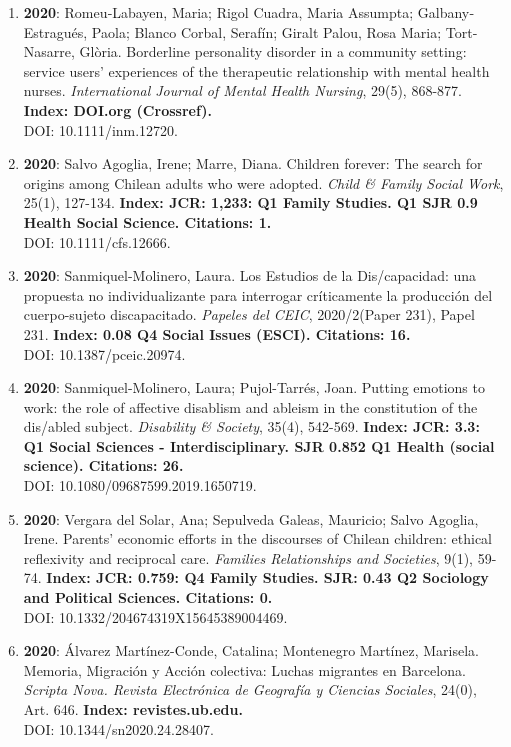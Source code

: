 \begin{enumerate}
\item {\bf 2020}: Romeu‐Labayen, Maria; Rigol Cuadra, Maria Assumpta; Galbany‐Estragués, Paola; Blanco Corbal, Serafín; Giralt Palou, Rosa Maria; Tort‐Nasarre, Glòria.  Borderline personality disorder in a community setting: service users' experiences of the therapeutic relationship with mental health nurses. {\it International Journal of Mental Health Nursing}, 29(5), 868-877. {\bf Index: DOI.org (Crossref). } \\ DOI: 10.1111/inm.12720. \filbreak
\item {\bf 2020}: Salvo Agoglia, Irene; Marre, Diana.  Children forever: The search for origins among Chilean adults who were adopted. {\it Child \& Family Social Work}, 25(1), 127-134. {\bf Index: JCR: 1,233: Q1 Family Studies.  Q1 SJR 0.9 Health Social Science. Citations: 1. } \\ DOI: 10.1111/cfs.12666. \filbreak
\item {\bf 2020}: Sanmiquel-Molinero, Laura.  Los Estudios de la Dis/capacidad: una propuesta no individualizante para interrogar críticamente la producción del cuerpo-sujeto discapacitado. {\it Papeles del CEIC}, 2020/2(Paper 231), Papel 231. {\bf Index: 0.08 Q4 Social Issues (ESCI). Citations: 16. } \\ DOI: 10.1387/pceic.20974. \filbreak
\item {\bf 2020}: Sanmiquel-Molinero, Laura; Pujol-Tarrés, Joan.  Putting emotions to work: the role of affective disablism and ableism in the constitution of the dis/abled subject. {\it Disability \& Society}, 35(4), 542-569. {\bf Index: JCR: 3.3: Q1 Social Sciences - Interdisciplinary.  SJR 0.852 Q1 Health (social science). Citations: 26. } \\ DOI: 10.1080/09687599.2019.1650719. \filbreak
\item {\bf 2020}: Vergara del Solar, Ana; Sepulveda Galeas, Mauricio; Salvo Agoglia, Irene.  Parents' economic efforts in the discourses of Chilean children: ethical reflexivity and reciprocal care. {\it Families Relationships and Societies}, 9(1), 59-74. {\bf Index: JCR: 0.759: Q4 Family Studies.  SJR: 0.43 Q2 Sociology and Political Sciences. Citations: 0. } \\ DOI: 10.1332/204674319X15645389004469. \filbreak
\item {\bf 2020}: Álvarez Martínez-Conde, Catalina; Montenegro Martínez, Marisela.  Memoria, Migración y Acción colectiva: Luchas migrantes en Barcelona. {\it Scripta Nova. Revista Electrónica de Geografía y Ciencias Sociales}, 24(0), Art. 646. {\bf Index: revistes.ub.edu. } \\ DOI: 10.1344/sn2020.24.28407. \filbreak

\end{enumerate}
